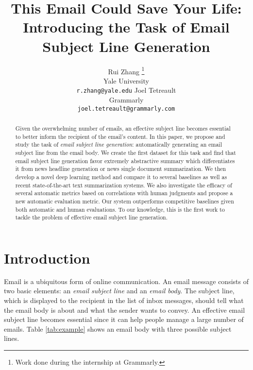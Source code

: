 \documentclass[11pt,a4paper]{article}
\title{This Email Could Save Your Life: Introducing the Task of Email Subject Line Generation}
\author{Rui Zhang \thanks{\quad Work done during the internship at Grammarly.} \\ Yale University \\ {\tt r.zhang@yale.edu} \And Joel Tetreault \\ Grammarly \\ {\tt joel.tetreault@grammarly.com}}
\date{}
\begin{document}
\maketitle
\begin{abstract}
Given the overwhelming number of emails, an effective subject line becomes essential to better inform the recipient of the email's content.
In this paper, we propose and study the task of \textit{email subject line generation}: automatically generating an email subject line from the email body.
We create the first dataset for this task and find that email subject line generation favor extremely abstractive summary which differentiates it from news headline generation or news single document summarization.
We then develop a novel deep learning method and compare it to several baselines as well as recent state-of-the-art text summarization systems.
We also investigate the efficacy of several automatic metrics based on correlations with human judgments and propose a new automatic evaluation metric.
Our system outperforms competitive baselines given both automatic and human evaluations.
To our knowledge, this is the first work to tackle the problem of effective email subject line generation.
\end{abstract}

\vspace{-4mm}
\section{Introduction}
\vspace{-1mm}
Email is a ubiquitous form of online communication.
An email message consists of two basic elements: an \textit{email subject line} and an \textit{email body}.
The subject line, which is displayed to the recipient in the list of inbox messages, should tell what the email body is about and what the sender wants to convey.
An effective email subject line becomes essential since it can help people manage a large number of emails.
Table \ref{tab:example} shows an email body with three possible subject lines.
\end{document}
